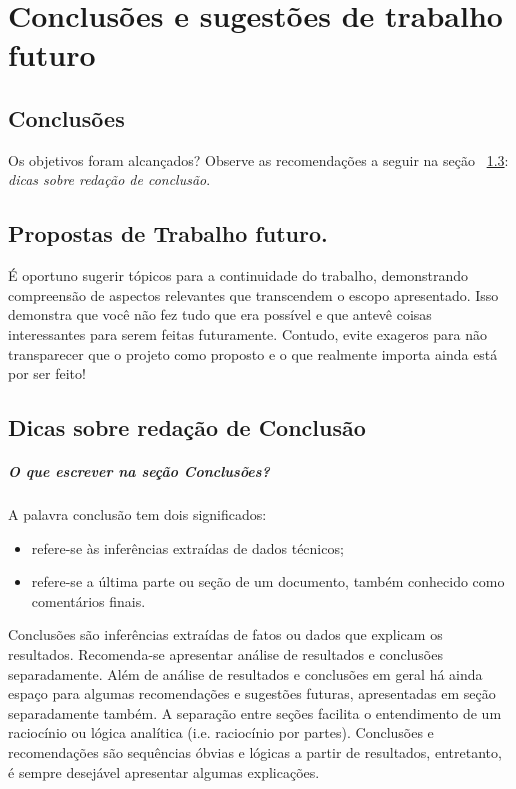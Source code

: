 \chapter{Conclusões e sugestões de trabalho futuro\label{cap6}}

\section{Conclusões}
 Os objetivos foram alcançados? Observe as recomendações a seguir na seção~ \ref{sec:dicasConclusao}:  \emph{dicas sobre redação de conclusão}.
 
 
\section{Propostas de Trabalho futuro.}

É oportuno sugerir tópicos para a continuidade do trabalho, demonstrando compreensão de aspectos relevantes que transcendem o escopo apresentado. Isso demonstra que você não fez tudo que era possível e que antevê coisas interessantes para serem feitas futuramente. Contudo, evite exageros para não transparecer que o projeto como proposto e o que realmente importa ainda está por ser feito!


\section{Dicas sobre redação de Conclusão}\label{sec:dicasConclusao}

\paragraph{O que escrever na seção Conclusões?}
A palavra conclusão tem dois significados: 
\begin{itemize}
	\item refere-se às inferências extraídas de dados técnicos; 
	\item refere-se a última parte ou seção de um documento, também conhecido como comentários finais.
\end{itemize}

Conclusões são inferências extraídas de fatos ou dados que explicam os resultados. Recomenda-se apresentar análise de resultados e conclusões separadamente. Além de análise de resultados e conclusões em geral há ainda espaço para algumas recomendações e sugestões futuras, apresentadas em seção separadamente também. A separação entre seções facilita o entendimento de um raciocínio ou lógica analítica (i.e. raciocínio por partes). 
Conclusões e recomendações são sequências óbvias e lógicas a partir de resultados, entretanto, é sempre desejável apresentar algumas explicações.

